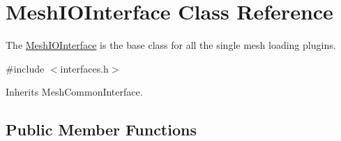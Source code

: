\hypertarget{class_mesh_i_o_interface}{}\section{Mesh\+I\+O\+Interface Class Reference}
\label{class_mesh_i_o_interface}


The \hyperlink{class_mesh_i_o_interface}{Mesh\+I\+O\+Interface} is the base class for all the single mesh loading plugins.  




{\ttfamily \#include $<$interfaces.\+h$>$}



Inherits Mesh\+Common\+Interface.

\subsection*{Public Member Functions}
